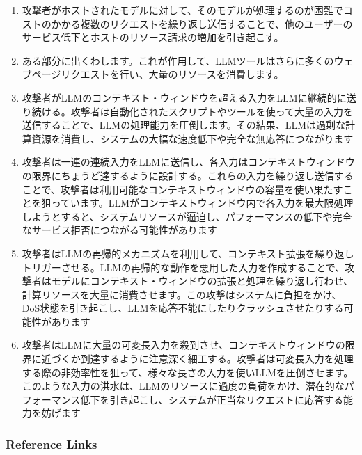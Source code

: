 \documentclass[
]{article}
\providecommand{\tightlist}{%
  \setlength{\itemsep}{0pt}\setlength{\parskip}{0pt}}
\begin{document}
\begin{enumerate}
\def\labelenumi{\arabic{enumi}.}
\tightlist
\item
  攻撃者がホストされたモデルに対して、そのモデルが処理するのが困難でコストのかかる複数のリクエストを繰り返し送信することで、他のユーザーのサービス低下とホストのリソース請求の増加を引き起こす。
\item
  ある部分に出くわします。これが作用して、LLMツールはさらに多くのウェブページリクエストを行い、大量のリソースを消費します。
\item
  攻撃者がLLMのコンテキスト・ウィンドウを超える入力をLLMに継続的に送り続ける。攻撃者は自動化されたスクリプトやツールを使って大量の入力を送信することで、LLMの処理能力を圧倒します。その結果、LLMは過剰な計算資源を消費し、システムの大幅な速度低下や完全な無応答につながります
\item
  攻撃者は一連の連続入力をLLMに送信し、各入力はコンテキストウィンドウの限界にちょうど達するように設計する。これらの入力を繰り返し送信することで、攻撃者は利用可能なコンテキストウィンドウの容量を使い果たすことを狙っています。LLMがコンテキストウィンドウ内で各入力を最大限処理しようとすると、システムリソースが逼迫し、パフォーマンスの低下や完全なサービス拒否につながる可能性があります
\item
  攻撃者はLLMの再帰的メカニズムを利用して、コンテキスト拡張を繰り返しトリガーさせる。LLMの再帰的な動作を悪用した入力を作成することで、攻撃者はモデルにコンテキスト・ウィンドウの拡張と処理を繰り返し行わせ、計算リソースを大量に消費させます。この攻撃はシステムに負担をかけ、DoS状態を引き起こし、LLMを応答不能にしたりクラッシュさせたりする可能性があります
\item
  攻撃者はLLMに大量の可変長入力を殺到させ、コンテキストウィンドウの限界に近づくか到達するように注意深く細工する。攻撃者は可変長入力を処理する際の非効率性を狙って、様々な長さの入力を使いLLMを圧倒させます。このような入力の洪水は、LLMのリソースに過度の負荷をかけ、潜在的なパフォーマンス低下を引き起こし、システムが正当なリクエストに応答する能力を妨げます
\end{enumerate}

\subsubsection{Reference Links}\label{reference-links}
\end{document}
